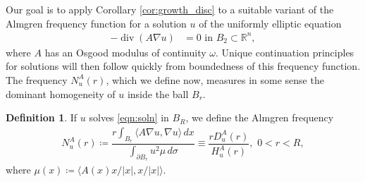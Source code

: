 \documentclass[12pt,leqno]{amsart}
\numberwithin{equation}{section}
\theoremstyle{definition}
\newtheorem{defn}[lemma]{\bf Definition}
\newcommand{\R}{\mathbb{R}}
\newcommand{\abs}[1]{\left \lvert #1 \right \rvert}
\DeclareMathOperator{\divv}{\mathrm{div}}
\begin{document}
	Our goal is to apply Corollary \ref{cor:growth_disc} to a suitable variant of the Almgren frequency function for a solution $u$ of the uniformly elliptic equation
	\begin{align}
		-\divv(A \nabla u) & = 0  \text{ in } B_2 \subset \R^n, \label{eqn:soln}
	\end{align}
	where $A$ has an Osgood modulus of continuity $\omega$. Unique continuation principles for solutions will then follow quickly from boundedness of this frequency function. The frequency $N_u^A(r)$, which we define now, measures in some sense the dominant homogeneity of $u$ inside the ball $B_r$.
	\begin{defn}\label{defn:almgren}
		If $u$ solves \eqref{eqn:soln} in $B_{R}$, we define the Almgren frequency
		\begin{align}
			N_{u}^A(r) \coloneqq \dfrac{r   \int_{B_r} \langle A \nabla u, \nabla u \rangle  \, dx }{\int_{\partial B_r} u^2 \mu  \, d\sigma } \equiv \dfrac{r D_u^A(r)}{H_u^A(r)}, \, \, 0 < r  < R,
		\end{align}
		where $\mu(x) \coloneqq \langle A(x) x/\abs{x}, x/\abs{x}\rangle$.
	\end{defn}
	
	
	
\end{document}
